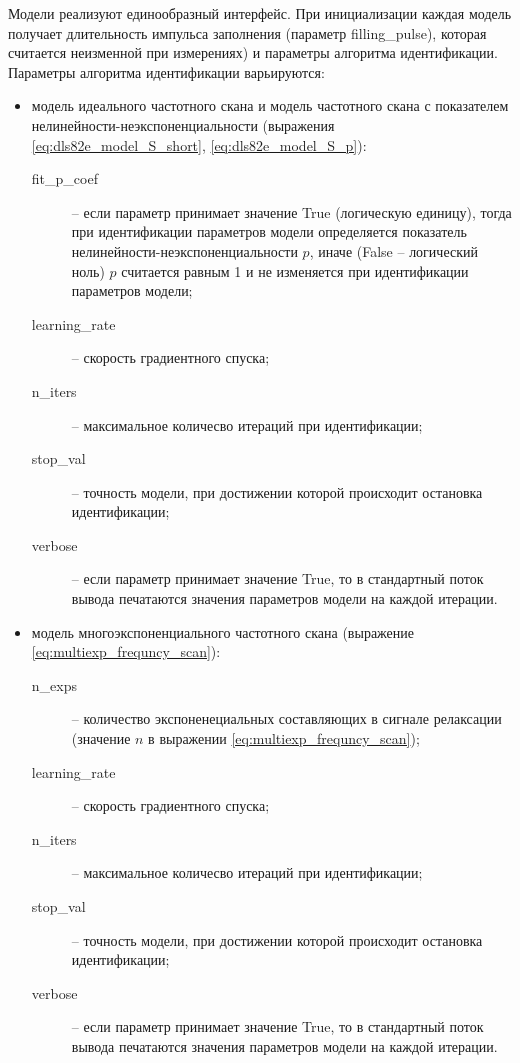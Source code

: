 	Модели реализуют единообразный интерфейс. При инициализации каждая модель 
	получает длительность импульса заполнения (параметр filling\_pulse),
	которая считается неизменной при измерениях) и параметры алгоритма 
	идентификации. Параметры алгоритма идентификации варьируются:
	\begin{itemize}
		\item модель идеального частотного скана и модель частотного скана с 
		показателем нелинейности-неэкспоненциальности (выражения 
		\ref{eq:dls82e_model_S_short}, \ref{eq:dls82e_model_S_p}): 
			\begin{description}
				\item[fit\_p\_coef] -- если параметр принимает значение True 
				(логическую единицу), тогда при идентификации параметров модели
				определяется показатель нелинейности-неэкспоненциальности $p$,
				иначе (False -- логический ноль) $p$ считается равным 1 и не 
				изменяется при идентификации параметров модели;
				\item[learning\_rate] -- скорость градиентного спуска;
				\item[n\_iters] -- максимальное количесво итераций при 
				идентификации;
				\item[stop\_val] -- точность модели, при достижении которой
				происходит остановка идентификации;
				\item[verbose] -- если параметр принимает значение True, то в 
				стандартный поток вывода печатаются значения параметров модели
				на каждой итерации.
			\end{description}

		\item модель многоэкспоненциального частотного скана (выражение 
		\ref{eq:multiexp_frequncy_scan}):
			\begin{description}
				\item[n\_exps] -- количество экспоненециальных составляющих в 
				сигнале релаксации (значение $n$ в выражении 
				\ref{eq:multiexp_frequncy_scan});
				\item[learning\_rate] -- скорость градиентного спуска;
				\item[n\_iters] -- максимальное количесво итераций при 
				идентификации;
				\item[stop\_val] -- точность модели, при достижении которой 
				происходит остановка идентификации;
				\item[verbose] -- если параметр принимает значение True, то в 
				стандартный поток вывода печатаются значения параметров модели
				на каждой итерации.
			\end{description}
	\end{itemize}

